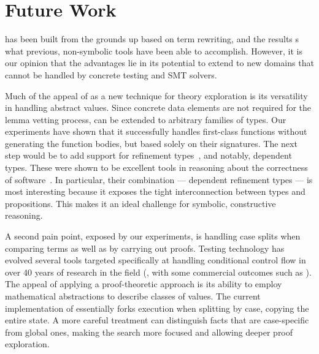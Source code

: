 \section{Future Work}

\TheSy has been built from the grounds up based on term rewriting, and the results s what previous, non-symbolic tools have been able to accomplish.
However, it is our opinion that the advantages lie in its  potential to extend to new domains that cannot be
handled by concrete testing and SMT solvers.

Much of the appeal of \TheSy as a new technique for theory
exploration is its versatility in handling abstract values.
Since concrete data elements are not required for the lemma vetting process,
\TheSy can be extended to arbitrary families of types.
Our experiments have shown that it successfully handles first-class functions without generating the function bodies, but based solely on their signatures.
The next step would be to add support for refinement types~\cite{pldi91/freeman},
and notably, dependent types.
These were shown to be excellent tools in reasoning about the correctness of software~\cite{icfp14/vazou,book/cpdt,oopsla19/jad}.
In particular, their combination --- dependent refinement types --- is most interesting because it exposes the tight interconnection between types and propositions.
This makes it an ideal challenge for symbolic, constructive reasoning.

A second pain point, exposed by our experiments, is handling case splits when comparing terms as well as by carrying out proofs.
Testing technology has evolved several tools targeted specifically at handling conditional control flow in over 40 years of research in the field (\cite{cacm76/king}, with some commercial outcomes such as \cite{TaP2008:Tillman}).
The appeal of applying a proof-theoretic approach is its ability to employ mathematical abstractions to describe classes of values.
The current implementation of \TheSy essentially forks execution when splitting by case, copying the entire state.
A more careful treatment can distinguish facts that are case-specific from global ones, making the search more focused and allowing deeper proof exploration.